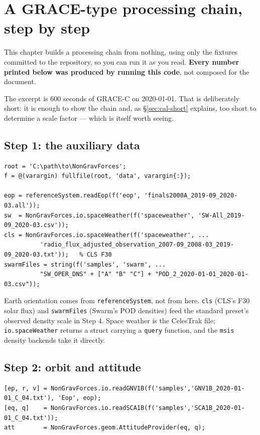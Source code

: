 \documentclass[11pt,a4paper]{report}
\begin{document}
\chapter{A GRACE-type processing chain, step by step}
\label{ch:walkthrough}

This chapter builds a processing chain from nothing, using only the fixtures committed to the
repository, so you can run it as you read. \textbf{Every number printed below was produced by
running this code}, not composed for the document.

The excerpt is 600 seconds of GRACE-C on 2020-01-01. That is deliberately short: it is enough to
show the chain and, as \S\ref{sec:cal-short} explains, too short to determine a scale factor ---
which is itself worth seeing.

\section{Step 1: the auxiliary data}
\begin{lstlisting}
root = 'C:\path\to\NonGravForces';
f = @(varargin) fullfile(root, 'data', varargin{:});

eop = referenceSystem.readEop(f('eop', 'finals2000A_2019-09_2020-03.all'));
sw  = NonGravForces.io.spaceWeather(f('spaceweather', 'SW-All_2019-09_2020-03.csv'));
cls = NonGravForces.io.spaceWeather(f('spaceweather', ...
          'radio_flux_adjusted_observation_2007-09_2008-03_2019-09_2020-03.txt'));   % CLS F30
swarmFiles = string(f('samples', 'swarm', ...
          "SW_OPER_DNS" + ["A" "B" "C"] + "POD_2_2020-01-01_2020-01-03.csv"));
\end{lstlisting}

\noindent Earth orientation comes from \texttt{referenceSystem}, not from here. \texttt{cls} (CLS's
F30 solar flux) and \texttt{swarmFiles} (Swarm's POD densities) feed the standard preset's observed
density scale in Step 4. Space weather is the
CelesTrak file; \texttt{io.spaceWeather} returns a struct carrying a \texttt{query} function, and
the \texttt{msis} density backends take it directly.

\section{Step 2: orbit and attitude}
\begin{lstlisting}
[ep, r, v] = NonGravForces.io.readGNV1B(f('samples','GNV1B_2020-01-01_C_04.txt'), 'Eop', eop);
[eq, q]    = NonGravForces.io.readSCA1B(f('samples','SCA1B_2020-01-01_C_04.txt'));
att        = NonGravForces.geom.AttitudeProvider(eq, q);
\end{lstlisting}
\end{document}
